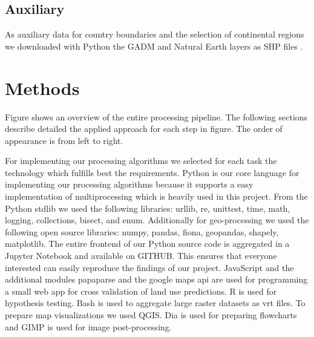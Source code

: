 	\subsection{Auxiliary}
		As auxiliary data for country boundaries and the selection of continental regions we downloaded with Python the \ac{GADM} and Natural Earth layers as \ac{SHP} files \citep{Hijmans2018,Rossum2018}.

\section{Methods}
\label{sec:methods}
	Figure  shows an overview of the entire processing pipeline. The following sections describe detailed the applied approach for each step in figure. The order of appearance is from left to right. 

	For implementing our processing algorithms we selected for each task the technology which fulfills best the requirements. Python is our core language for implementing our processing algorithms because it supports a easy implementation of multiprocessing which is heavily used in this project. From the Python \ac{stdlib} we used the following libraries: urllib, re, unittest, time, math, logging, collections, bisect, and enum. Additionally for geo-processing we used the following open source libraries: numpy, pandas, fiona, geopandas, shapely, matplotlib. The entire frontend of our Python source code is aggregated in a Jupyter Notebook and available on GITHUB. This ensures that everyone interested can easily reproduce the findings of our project. JavaScript and the additional modules papaparse and the google maps api are used for programming a small web app for cross validation of land use predictions. R is used for hypothesis testing. Bash is used to aggregate large raster datasets as vrt files. To prepare map visualizations we used QGIS. Dia is used for preparing flowcharts and GIMP is used for image post-processing.

